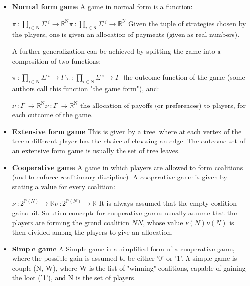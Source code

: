 \documentclass[]{report}
\begin{document}
\begin{itemize}
\item \textbf{Normal form game}
A game in normal form is a function:

${\displaystyle \pi \ :\prod _{i\in \mathrm {N} }\Sigma \ ^{i}\to \mathbb {R} ^{\mathrm {N} }} \pi \ :\prod _{i\in \mathrm {N} }\Sigma \ ^{i}\to \mathbb {R} ^{\mathrm {N} }$
Given the tuple of strategies chosen by the players, one is given an allocation of payments (given as real numbers).

A further generalization can be achieved by splitting the game into a composition of two functions:

${\displaystyle \pi \ :\prod _{i\in \mathrm {N} }\Sigma \ ^{i}\to \Gamma \ } \pi \ :\prod _{i\in \mathrm {N} }\Sigma \ ^{i}\to \Gamma \ $
the outcome function of the game (some authors call this function "the game form"), and:

${\displaystyle \nu \ :\Gamma \ \to \mathbb {R} ^{\mathrm {N} }} \nu \ :\Gamma \ \to \mathbb {R} ^{\mathrm {N} }$
the allocation of payoffs (or preferences) to players, for each outcome of the game.

\item \textbf{Extensive form game}
This is given by a tree, where at each vertex of the tree a different player has the choice of choosing an edge. The outcome set of an extensive form game is usually the set of tree leaves.

\item \textbf{Cooperative game}
A game in which players are allowed to form coalitions (and to enforce coalitionary discipline). A cooperative game is given by stating a value for every coalition:

${\displaystyle \nu \ :2^{\mathbb {P} (N)}\to \mathbb {R} } \nu \ :2^{\mathbb {P} (N)}\to \mathbb {R} $
It is always assumed that the empty coalition gains nil. Solution concepts for cooperative games usually assume that the players are forming the grand coalition ${\displaystyle N} N$, whose value ${\displaystyle \nu (N)} \nu (N) $ is then divided among the players to give an allocation.

\item \textbf{Simple game}
A Simple game is a simplified form of a cooperative game, where the possible gain is assumed to be either '0' or '1'. A simple game is couple (N, W), where W is the list of "winning" coalitions, capable of gaining the loot ('1'), and N is the set of players.


\end{itemize}
\end{document}
